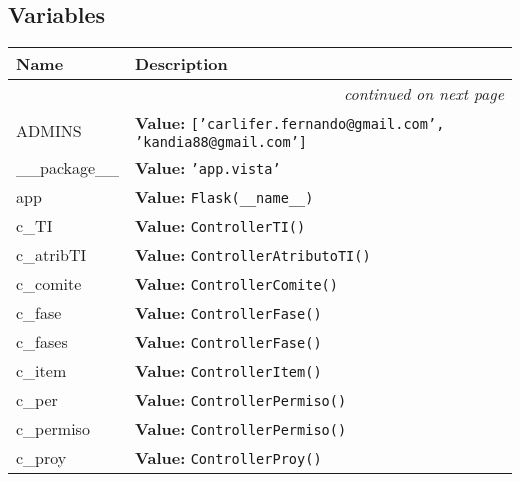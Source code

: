   \subsection{Variables}

    \vspace{-1cm}
\hspace{\varindent}\begin{longtable}{|p{\varnamewidth}|p{\vardescrwidth}|l}
\cline{1-2}
\cline{1-2} \centering \textbf{Name} & \centering \textbf{Description}& \\
\cline{1-2}
\endhead\cline{1-2}\multicolumn{3}{r}{\small\textit{continued on next page}}\\\endfoot\cline{1-2}
\endlastfoot\raggedright A\-D\-M\-I\-N\-S\- & \raggedright \textbf{Value:} 
{\tt \texttt{[}\texttt{'}\texttt{carlifer.fernando@gmail.com}\texttt{'}\texttt{, }\texttt{'}\texttt{kandia88@gmail.com}\texttt{'}\texttt{]}}&\\
\cline{1-2}
\raggedright \_\-\_\-p\-a\-c\-k\-a\-g\-e\-\_\-\_\- & \raggedright \textbf{Value:} 
{\tt \texttt{'}\texttt{app.vista}\texttt{'}}&\\
\cline{1-2}
\raggedright a\-p\-p\- & \raggedright \textbf{Value:} 
{\tt Flask(\_\_name\_\_)}&\\
\cline{1-2}
\raggedright c\-\_\-T\-I\- & \raggedright \textbf{Value:} 
{\tt ControllerTI()}&\\
\cline{1-2}
\raggedright c\-\_\-a\-t\-r\-i\-b\-T\-I\- & \raggedright \textbf{Value:} 
{\tt ControllerAtributoTI()}&\\
\cline{1-2}
\raggedright c\-\_\-c\-o\-m\-i\-t\-e\- & \raggedright \textbf{Value:} 
{\tt ControllerComite()}&\\
\cline{1-2}
\raggedright c\-\_\-f\-a\-s\-e\- & \raggedright \textbf{Value:} 
{\tt ControllerFase()}&\\
\cline{1-2}
\raggedright c\-\_\-f\-a\-s\-e\-s\- & \raggedright \textbf{Value:} 
{\tt ControllerFase()}&\\
\cline{1-2}
\raggedright c\-\_\-i\-t\-e\-m\- & \raggedright \textbf{Value:} 
{\tt ControllerItem()}&\\
\cline{1-2}
\raggedright c\-\_\-p\-e\-r\- & \raggedright \textbf{Value:} 
{\tt ControllerPermiso()}&\\
\cline{1-2}
\raggedright c\-\_\-p\-e\-r\-m\-i\-s\-o\- & \raggedright \textbf{Value:} 
{\tt ControllerPermiso()}&\\
\cline{1-2}
\raggedright c\-\_\-p\-r\-o\-y\- & \raggedright \textbf{Value:} 
{\tt ControllerProy()}&\\

\end{longtable}

